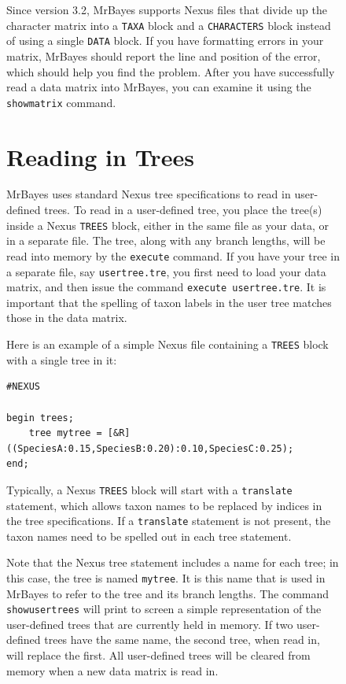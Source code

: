 \documentclass[12pt]{book}
\newcommand{\ttt}[1]{\texttt{#1}}
\begin{document}
\begin{figure}[h]
Since version 3.2, MrBayes supports Nexus files that divide up the character matrix into a
\ttt{TAXA} block and a \ttt{CHARACTERS} block instead of using a single \ttt{DATA} block. If you
have formatting errors in your matrix, MrBayes should report the line and position of the error,
which should help you find the problem. After you have successfully read a data matrix into
MrBayes, you can examine it using the \ttt{showmatrix} command.

\section{Reading in Trees}

MrBayes uses standard Nexus tree specifications to read in user-defined trees. To read in a
user-defined tree, you place the tree(s) inside a Nexus \ttt{TREES} block, either in the same file
as your data, or in a separate file. The tree, along with any branch lengths, will be read into
memory by the \ttt{execute} command. If you have your tree in a separate file, say
\ttt{usertree.tre}, you first need to load your data matrix, and then issue the command
\ttt{execute usertree.tre}. It is important that the spelling of taxon labels in the user tree
matches those in the data matrix. 

Here is an example of a simple Nexus file containing a \ttt{TREES} block with a single tree in it:

\footnotesize
\begin{singlespacing}
\begin{verbatim}
#NEXUS

begin trees;
    tree mytree = [&R] ((SpeciesA:0.15,SpeciesB:0.20):0.10,SpeciesC:0.25);
end;
\end{verbatim}
\end{singlespacing}
\normalsize

Typically, a Nexus \ttt{TREES} block will start with a \ttt{translate} statement, which allows
taxon names to be replaced by indices in the tree specifications. If a \ttt{translate} statement is
not present, the taxon names need to be spelled out in each tree statement.

Note that the Nexus tree statement includes a name for each tree; in this case, the tree is named
\ttt{mytree}. It is this name that is used in MrBayes to refer to the tree and its branch lengths.
The command \ttt{showusertrees} will print to screen a simple representation of the user-defined
trees that are currently held in memory. If two user-defined trees have the same name, the second
tree, when read in, will replace the first. All user-defined trees will be cleared from memory when
a new data matrix is read in.


\end{figure}
\end{document}
